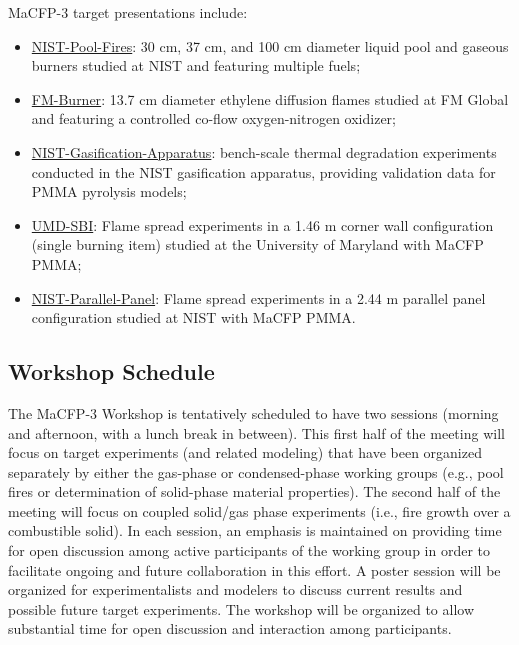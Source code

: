 \documentclass[12pt]{article}
\begin{document}
MaCFP-3 target presentations include:
\begin{itemize}[noitemsep,topsep=0pt]
\item \href{https://github.com/MaCFP/macfp-db/tree/master/Liquid_Pool_Fires/NIST_Pool_Fires}{NIST-Pool-Fires}: 30 cm, 37 cm, and 100 cm diameter liquid pool and gaseous burners studied at NIST and featuring multiple fuels;
\item \href{https://github.com/MaCFP/macfp-db/tree/master/Extinction/FM_Burner}{FM-Burner}: 13.7 cm diameter ethylene diffusion flames studied at FM Global and featuring a controlled co-flow oxygen-nitrogen oxidizer;
\item \href{https://github.com/MaCFP/matl-db/tree/master/PMMA/Validation_Data/NIST_Gasification_Apparatus}{NIST-Gasification-Apparatus}: bench-scale thermal degradation experiments conducted in the NIST gasification apparatus, providing validation data for PMMA pyrolysis models;
\item \href{https://github.com/MaCFP/macfp-db/tree/master/Fire_Growth/UMD_SBI}{UMD-SBI}: Flame spread experiments in a 1.46 m corner wall configuration (single burning item) studied at the University of Maryland with MaCFP PMMA;
\item \href{https://github.com/MaCFP/macfp-db/tree/master/Fire_Growth/NIST_Parallel_Panel}{NIST-Parallel-Panel}: Flame spread experiments in a 2.44 m parallel panel configuration studied at NIST with MaCFP PMMA.
\end{itemize}


\subsection{Workshop Schedule}

The MaCFP-3 Workshop is tentatively scheduled to have two sessions (morning and afternoon, with a lunch break in between). This first half of the meeting will focus on target experiments (and related modeling) that have been organized separately by either the gas-phase or condensed-phase working groups (e.g., pool fires or determination of solid-phase material properties). The second half of the meeting will focus on coupled solid/gas phase experiments (i.e., fire growth over a combustible solid). In each session, an emphasis is maintained on providing time for open discussion among active participants of the working group in order to facilitate ongoing and future collaboration in this effort. A poster session will be organized for experimentalists and modelers to discuss current results and possible future target experiments. The workshop will be organized to allow substantial time for open discussion and interaction among participants.
\end{document}
